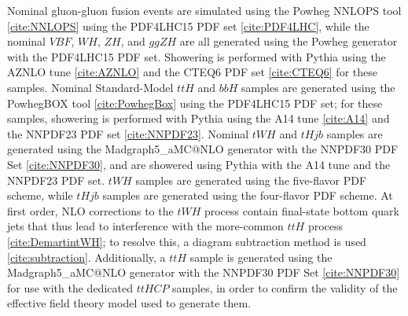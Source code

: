 \begin{table}[h!]
  \centering
  \caption{Summary of nominal signal samples}
  \label{tab:signal_samples_pyt}
\end{table}

Nominal gluon-gluon fusion events are simulated using the Powheg NNLOPS tool \ref{cite:NNLOPS} using the PDF4LHC15 PDF set \ref{cite:PDF4LHC}, while the nominal $VBF$, $WH$, $ZH$, and $ggZH$ are all generated using the Powheg generator with the PDF4LHC15 PDF set. Showering is performed with Pythia using the AZNLO tune \ref{cite:AZNLO} and the CTEQ6 PDF set \ref{cite:CTEQ6} for these samples. Nominal Standard-Model $ttH$ and $bbH$ samples are generated using the PowhegBOX tool \ref{cite:PowhegBox} using the PDF4LHC15 PDF set; for these samples, showering is performed with Pythia using the A14 tune \ref{cite:A14} and the NNPDF23 PDF set \ref{cite:NNPDF23}. Nominal $tWH$ and $tHjb$ samples are generated using the Madgraph5\_aMC@NLO generator with the NNPDF30 PDF Set \ref{cite:NNPDF30}, and are showered using Pythia with the A14 tune and the NNPDF23 PDF set. $tWH$ samples are generated using the five-flavor PDF scheme, while $tHjb$ samples are generated using the four-flavor PDF scheme. At first order, NLO corrections to the $tWH$ process contain final-state bottom quark jets that thus lead to interference with the more-common $ttH$ process \ref{cite:DemartintWH}; to resolve this, a diagram subtraction method is used \ref{cite:subtraction}.
Additionally, a $ttH$ sample is generated using the Madgraph5\_aMC@NLO generator with the NNPDF30 PDF Set \ref{cite:NNPDF30} for use with the dedicated $ttH CP$ samples, in order to confirm the validity of the effective field theory model used to generate them.


